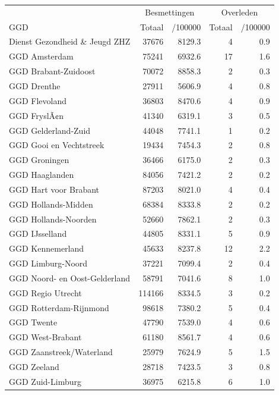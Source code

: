 \documentclass[
  english,
  man,floatsintext]{apa6}
\begin{document}
\begin{table}
\centering\begingroup\fontsize{10}{12}\selectfont

\begin{threeparttable}
\begin{tabular}{lrrrr}
\toprule
\multicolumn{1}{c}{ } & \multicolumn{2}{c}{Besmettingen} & \multicolumn{2}{c}{Overleden} \\
\cmidrule(l{3pt}r{3pt}){2-3} \cmidrule(l{3pt}r{3pt}){4-5}
GGD & Totaal & /100000 & Totaal & /100000\\
\midrule
Dienst Gezondheid \& Jeugd ZHZ & 37676 & 8129.3 & 4 & 0.9\\
GGD Amsterdam & 75241 & 6932.6 & 17 & 1.6\\
GGD Brabant-Zuidoost & 70072 & 8858.3 & 2 & 0.3\\
GGD Drenthe & 27911 & 5606.9 & 4 & 0.8\\
GGD Flevoland & 36803 & 8470.6 & 4 & 0.9\\
GGD FryslÃ¢n & 41340 & 6319.1 & 3 & 0.5\\
GGD Gelderland-Zuid & 44048 & 7741.1 & 1 & 0.2\\
GGD Gooi en Vechtstreek & 19434 & 7454.3 & 2 & 0.8\\
GGD Groningen & 36466 & 6175.0 & 2 & 0.3\\
GGD Haaglanden & 84056 & 7421.2 & 2 & 0.2\\
GGD Hart voor Brabant & 87203 & 8021.0 & 4 & 0.4\\
GGD Hollands-Midden & 68384 & 8333.8 & 2 & 0.2\\
GGD Hollands-Noorden & 52660 & 7862.1 & 2 & 0.3\\
GGD IJsselland & 44805 & 8331.1 & 5 & 0.9\\
GGD Kennemerland & 45633 & 8237.8 & 12 & 2.2\\
GGD Limburg-Noord & 37221 & 7099.4 & 2 & 0.4\\
GGD Noord- en Oost-Gelderland & 58791 & 7041.6 & 8 & 1.0\\
GGD Regio Utrecht & 114166 & 8334.5 & 3 & 0.2\\
GGD Rotterdam-Rijnmond & 98618 & 7380.2 & 5 & 0.4\\
GGD Twente & 47790 & 7539.0 & 4 & 0.6\\
GGD West-Brabant & 61180 & 8561.7 & 4 & 0.6\\
GGD Zaanstreek/Waterland & 25979 & 7624.9 & 5 & 1.5\\
GGD Zeeland & 28718 & 7423.5 & 3 & 0.8\\
GGD Zuid-Limburg & 36975 & 6215.8 & 6 & 1.0\\

\end{tabular}
\end{threeparttable}
\end{table}
\end{document}
